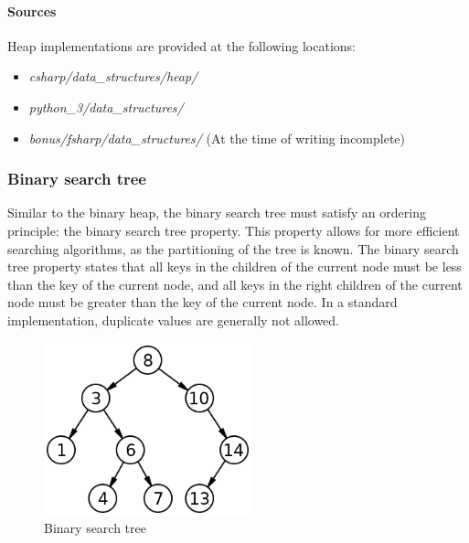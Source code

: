 \documentclass{article}
\begin{document}
\paragraph{Sources}
Heap implementations are provided at the following locations:
\begin{itemize}
\item{{\em csharp/data\_structures/heap/}}
\item{{\em python\_3/data\_structures/}}
\item{{\em bonus/fsharp/data\_structures/} (At the time of writing incomplete)}
\end{itemize}


\subsubsection{Binary search tree}
Similar to the binary heap, the binary search tree must satisfy an ordering principle: the binary search tree
property. This property allows for more efficient searching algorithms, as the partitioning of the tree is known.
The binary search tree property states that all keys in the children of the current node must be less than the key
of the current node, and all keys in the right children of the current node must be greater than the key of the
current node. In a standard implementation, duplicate values are generally not allowed.

\begin{figure}[H]
  \centering
  \includegraphics[width=6cm]{binary_search_tree}
  \caption{Binary search tree}
\end{figure}
\end{document}
